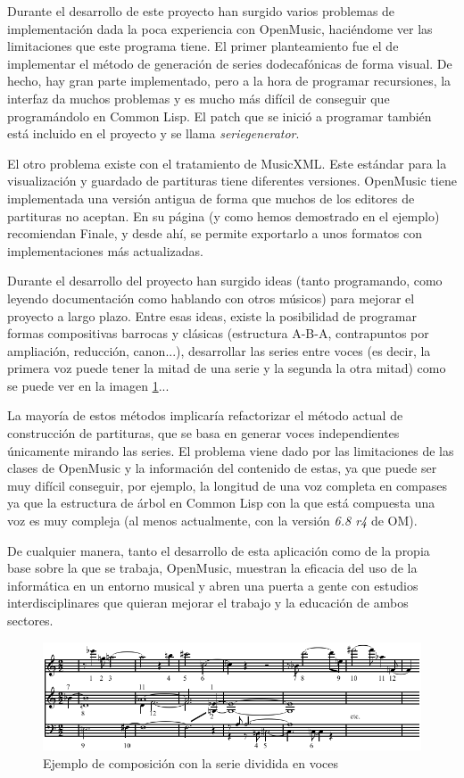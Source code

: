 \documentclass[a4paper,openany,12pt]{memoir}
\begin{document}
Durante el desarrollo de este proyecto han surgido varios problemas de implementación dada la poca experiencia con OpenMusic, haciéndome ver las limitaciones que este programa tiene. El primer planteamiento fue el de implementar el método de generación de series dodecafónicas de forma visual. De hecho, hay gran parte implementado, pero a la hora de programar recursiones, la interfaz da muchos problemas y es mucho más difícil de conseguir que programándolo en Common Lisp. El patch que se inició a programar también está incluido en el proyecto y se llama \emph{seriegenerator}.

El otro problema existe con el tratamiento de MusicXML. Este estándar para la visualización y guardado de partituras tiene diferentes versiones. OpenMusic tiene implementada una versión antigua de forma que muchos de los editores de partituras no aceptan. En su página (y como hemos demostrado en el ejemplo) recomiendan Finale, y desde ahí, se permite exportarlo a unos formatos con implementaciones más actualizadas.

Durante el desarrollo del proyecto han surgido ideas (tanto programando, como leyendo documentación como hablando con otros músicos) para mejorar el proyecto a largo plazo. Entre esas ideas, existe la posibilidad de programar formas compositivas barrocas y clásicas (estructura A-B-A, contrapuntos por ampliación, reducción, canon...), desarrollar las series entre voces (es decir, la primera voz puede tener la mitad de una serie y la segunda la otra mitad) como se puede ver en la imagen \ref{fig:twelvetoneexample}...

La mayoría de estos métodos implicaría refactorizar el método actual de construcción de partituras, que se basa en generar voces independientes únicamente mirando las series. El problema viene dado por las limitaciones de las clases de OpenMusic y la información del contenido de estas, ya que puede ser muy difícil conseguir, por ejemplo, la longitud de una voz completa en compases ya que la estructura de árbol en Common Lisp con la que está compuesta una voz es muy compleja (al menos actualmente, con la versión \emph{6.8 r4} de OM).

De cualquier manera, tanto el desarrollo de esta aplicación como de la propia base sobre la que se trabaja, OpenMusic, muestran la eficacia del uso de la informática en un entorno musical y abren una puerta a gente con estudios interdisciplinares que quieran mejorar el trabajo y la educación de ambos sectores.

\begin{figure}
\centering
\includegraphics[width=\textwidth]{img/Schoenberg_-_Wind_Quintet_opening.png}
\caption{Ejemplo de composición con la serie dividida en voces\cite{wiki:twelvetonetechnique}} \label{fig:twelvetoneexample}
\end{figure}
\end{document}
